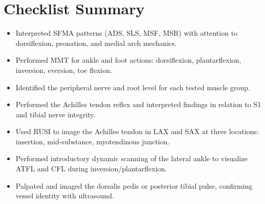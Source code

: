 \section*{Checklist Summary}

\begin{itemize}
  \item [$\square$] Interpreted SFMA patterns (ADS, SLS, MSF, MSR) with attention to dorsiflexion, pronation, and medial arch mechanics.
  \item [$\square$] Performed MMT for ankle and foot actions: dorsiflexion, plantarflexion, inversion, eversion, toe flexion.
  \item [$\square$] Identified the peripheral nerve and root level for each tested muscle group.
  \item [$\square$] Performed the Achilles tendon reflex and interpreted findings in relation to S1 and tibial nerve integrity.
  \item [$\square$] Used RUSI to image the Achilles tendon in LAX and SAX at three locations: insertion, mid-substance, myotendinous junction.
  \item [$\square$] Performed introductory dynamic scanning of the lateral ankle to visualize ATFL and CFL during inversion/plantarflexion.
  \item [$\square$] Palpated and imaged the dorsalis pedis or posterior tibial pulse, confirming vessel identity with ultrasound.
\end{itemize}